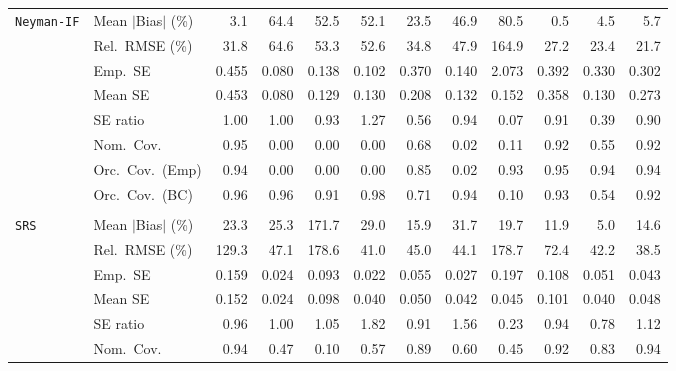 \begin{landscape}
\begin{longtable}{llrrrrrrrrrr}
\addlinespace[2pt]
\quad \texttt{Neyman-IF} & Mean $|$Bias$|$ (\%) & \cellcolor{ranktwo}3.1 & 64.4 & 52.5 & 52.1 & 23.5 & 46.9 & 80.5 & \cellcolor{rankone}0.5 & \cellcolor{rankthree}4.5 & 5.7 \\
 & Rel.\ RMSE (\%) & 31.8 & 64.6 & 53.3 & 52.6 & 34.8 & 47.9 & 164.9 & \cellcolor{rankthree}27.2 & \cellcolor{ranktwo}23.4 & \cellcolor{rankone}21.7 \\
 & Emp.\ SE & 0.455 & 0.080 & 0.138 & 0.102 & 0.370 & 0.140 & 2.073 & 0.392 & 0.330 & 0.302 \\
 & Mean SE & 0.453 & 0.080 & 0.129 & 0.130 & 0.208 & 0.132 & 0.152 & 0.358 & 0.130 & 0.273 \\
 & SE ratio & \cellcolor{rankone}1.00 & \cellcolor{rankone}1.00 & \cellcolor{rankthree}0.93 & 1.27 & 0.56 & \cellcolor{ranktwo}0.94 & 0.07 & 0.91 & 0.39 & 0.90 \\
 & Nom.\ Cov. & \cellcolor{rankone}0.95 & 0.00 & 0.00 & 0.00 & \cellcolor{rankthree}0.68 & 0.02 & 0.11 & \cellcolor{ranktwo}0.92 & 0.55 & \cellcolor{ranktwo}0.92 \\
 & Orc.\ Cov.\ (Emp) & \cellcolor{ranktwo}0.94 & 0.00 & 0.00 & 0.00 & 0.85 & 0.02 & \cellcolor{rankthree}0.93 & \cellcolor{rankone}0.95 & \cellcolor{ranktwo}0.94 & \cellcolor{ranktwo}0.94 \\
 & Orc.\ Cov.\ (BC) & \cellcolor{rankone}0.96 & \cellcolor{rankone}0.96 & 0.91 & \cellcolor{rankthree}0.98 & 0.71 & \cellcolor{rankone}0.94 & 0.10 & \cellcolor{ranktwo}0.93 & 0.54 & \cellcolor{rankthree}0.92 \\
\addlinespace[2pt]
\multicolumn{12}{l}{\textbf{Continuous Phase-One Covariates}} \\
\addlinespace[2pt]
\quad \texttt{SRS} & Mean $|$Bias$|$ (\%) & 23.3 & 25.3 & 171.7 & 29.0 & 15.9 & 31.7 & 19.7 & \cellcolor{ranktwo}11.9 & \cellcolor{rankone}5.0 & \cellcolor{rankthree}14.6 \\
 & Rel.\ RMSE (\%) & 129.3 & 47.1 & 178.6 & \cellcolor{ranktwo}41.0 & 45.0 & 44.1 & 178.7 & 72.4 & \cellcolor{rankthree}42.2 & \cellcolor{rankone}38.5 \\
 & Emp.\ SE & 0.159 & 0.024 & 0.093 & 0.022 & 0.055 & 0.027 & 0.197 & 0.108 & 0.051 & 0.043 \\
 & Mean SE & 0.152 & 0.024 & 0.098 & 0.040 & 0.050 & 0.042 & 0.045 & 0.101 & 0.040 & 0.048 \\
 & SE ratio & \cellcolor{ranktwo}0.96 & \cellcolor{rankone}1.00 & \cellcolor{rankthree}1.05 & 1.82 & 0.91 & 1.56 & 0.23 & 0.94 & 0.78 & 1.12 \\
 & Nom.\ Cov. & \cellcolor{rankone}0.94 & 0.47 & 0.10 & 0.57 & \cellcolor{rankthree}0.89 & 0.60 & 0.45 & \cellcolor{ranktwo}0.92 & 0.83 & \cellcolor{rankone}0.94 \\

\end{longtable}
\end{landscape}
